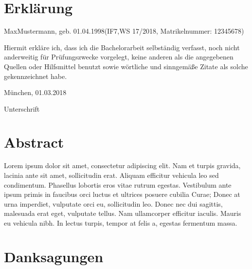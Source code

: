 \documentclass[listof=totoc,index=totoc,bibliography=totoc,12pt,german,a4paper,]{report}
\begin{document}
\chapter*{Erklärung}\label{erkluxe4rung}

\begin{center}
  Max\space Mustermann, geb. 01.04.1998\space(IF7,\space WS 17/2018, Matrikelnummer: 12345678)
\end{center}

\vspace*{1.0cm}

\noindent Hiermit erkläre ich, dass ich die Bachelorarbeit selbständig
verfasst, noch nicht anderweitig für Prüfungszwecke vorgelegt, keine
anderen als die angegebenen Quellen oder Hilfsmittel benutzt sowie
wörtliche und sinngemäße Zitate als solche gekennzeichnet habe.

\vspace*{1.0cm}

München, 01.03.2018

\vspace*{1.0cm}

\dotfill

Unterschrift \vspace*{\fill}  \newpage

\chapter*{Abstract}\label{abstract}

Lorem ipsum dolor sit amet, consectetur adipiscing elit. Nam et turpis
gravida, lacinia ante sit amet, sollicitudin erat. Aliquam efficitur
vehicula leo sed condimentum. Phasellus lobortis eros vitae rutrum
egestas. Vestibulum ante ipsum primis in faucibus orci luctus et
ultrices posuere cubilia Curae; Donec at urna imperdiet, vulputate orci
eu, sollicitudin leo. Donec nec dui sagittis, malesuada erat eget,
vulputate tellus. Nam ullamcorper efficitur iaculis. Mauris eu vehicula
nibh. In lectus turpis, tempor at felis a, egestas fermentum massa.

\setcounter{page}{1}

\newpage

\chapter*{Danksagungen}\label{danksagungen}
\end{document}
